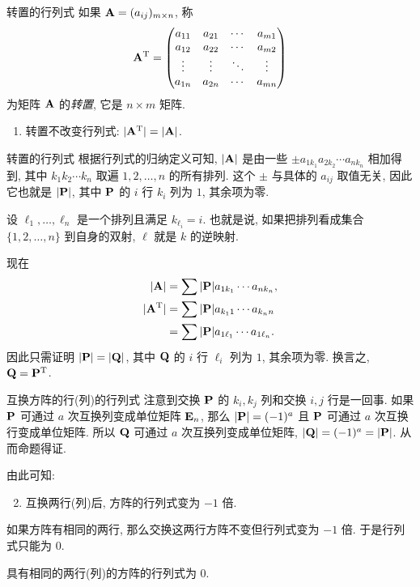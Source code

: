 \begin{frame}{转置的行列式}
	\onslide<+->
	如果 ${\mathbf{A}}=(a_{ij})_{m\times n}$, 称
	\[{\mathbf{A}}^{\mathrm{T}}=\begin{pmatrix}
		a_{11}&a_{21}&\cdots&a_{m1}\\
		a_{12}&a_{22}&\cdots&a_{m2}\\
		\vdots&\vdots&\ddots&\vdots\\
		a_{1n}&a_{2n}&\cdots&a_{mn}
	\end{pmatrix}\]
	为矩阵 ${\mathbf{A}}$ 的\emph{转置}, 它是 $n\times m$ 矩阵.
	\begin{alertblock@}
		\begin{enumerate}
			\item 转置不改变行列式: $|{\mathbf{A}}^{\mathrm{T}}|=|{\mathbf{A}}|$.
		\end{enumerate}
	\end{alertblock@}
\end{frame}


\begin{frame}{转置的行列式}
	\onslide<+->
	根据行列式的归纳定义可知, $|{\mathbf{A}}|$ 是由一些 $\pm a_{1 k_1}a_{2 k_2}\cdots a_{n k_n}$ 相加得到, 其中 $k_1 k_2 \cdots k_n$ 取遍 $1,2,\dots,n$ 的所有排列.
	\onslide<+->
	这个 $\pm$ 与具体的 $a_{ij}$ 取值无关, 因此它也就是 $|{\mathbf{P}}|$, 其中 ${\mathbf{P}}$ 的 $i$ 行 $k_i$ 列为 $1$, 其余项为零.

	\onslide<+->
	设 $\ell_1,\dots,\ell_n$ 是一个排列且满足 $k_{\ell_i}=i$.
	\onslide<+->
	也就是说, 如果把排列看成集合 $\{1,2,\dots,n\}$ 到自身的双射, $\ell$ 就是 $k$ 的逆映射.

	\onslide<+->
	现在
	\begin{align*}
		|{\mathbf{A}}|&=\sum|{\mathbf{P}}| a_{1k_1}\cdots a_{nk_n},\\
		|{\mathbf{A}}^{\mathrm{T}}|&=\sum|{\mathbf{P}}| a_{k_1 1}\cdots a_{k_n n}\\
		&=\sum|{\mathbf{P}}| a_{1\ell_1}\cdots a_{1 \ell_n}.
	\end{align*}
	\onslide<+->
	因此只需证明 $|{\mathbf{P}}|=|{\mathbf{Q}}|$, 其中 ${\mathbf{Q}}$ 的 $i$ 行 $\ell_i$ 列为 $1$, 其余项为零.
	\onslide<+->
	换言之, ${\mathbf{Q}}={\mathbf{P}}^{\mathrm{T}}$.
\end{frame}


\begin{frame}{互换方阵的行(列)的行列式}
	\onslide<+->
	注意到交换 ${\mathbf{P}}$ 的 $k_i,k_j$ 列和交换 $i,j$ 行是一回事.
	\onslide<+->
	如果 ${\mathbf{P}}$ 可通过 $a$ 次互换列变成单位矩阵 ${\mathbf{E}}_n$, 那么 $|{\mathbf{P}}|=(-1)^a$ 且 ${\mathbf{P}}$ 可通过 $a$ 次互换行变成单位矩阵.
	\onslide<+->
	所以 ${\mathbf{Q}}$ 可通过 $a$ 次互换列变成单位矩阵, $|{\mathbf{Q}}|=(-1)^a=|{\mathbf{P}}|$.
	从而命题得证.
	
	\onslide<+->
	由此可知:
	\begin{alertblock@}
	\begin{enumerate}
		\setcounter{enumi}{1}
		\item 互换两行(列)后, 方阵的行列式变为 $-1$ 倍.
	\end{enumerate}
	\end{alertblock@}
	\onslide<+->
	如果方阵有相同的两行, 那么交换这两行方阵不变但行列式变为 $-1$ 倍.
	\onslide<+->
	于是行列式只能为 $0$.
	\begin{corollary}
		具有相同的两行(列)的方阵的行列式为 $0$.
	\end{corollary}
\end{frame}


